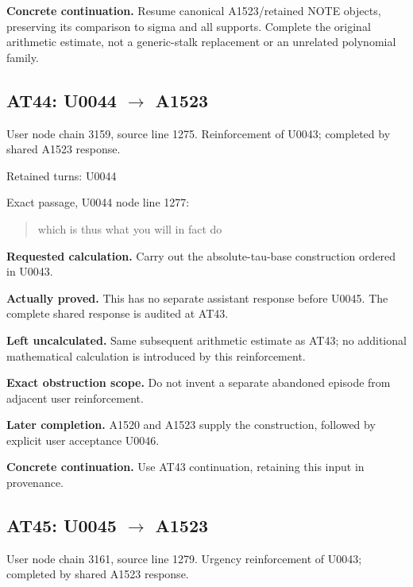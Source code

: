 \documentclass[10pt,a4paper,oneside]{report}
\begin{document}
\textbf{Concrete continuation.} Resume canonical A1523/retained NOTE
objects, preserving its comparison to sigma and all supports. Complete
the original arithmetic estimate, not a generic-stalk replacement or an
unrelated polynomial family.

\subsection{\texorpdfstring{AT44: U0044
\allowbreak{}\ensuremath{→}\allowbreak{}
A1523}{AT44: U0044  A1523}}\label{at44-u0044-a1523}

User node \protect{} chain
3159, source line 1275. Reinforcement of U0043; completed by shared
A1523 response.

Retained turns: U0044
\protect{}

Exact passage, U0044 node
\protect{} line 1277:

\begin{quote}
which is thus what you will in fact do
\end{quote}

\textbf{Requested calculation.} Carry out the absolute-tau-base
construction ordered in U0043.

\textbf{Actually proved.} This has no separate assistant response before
U0045. The complete shared response is audited at AT43.

\textbf{Left uncalculated.} Same subsequent arithmetic estimate as AT43;
no additional mathematical calculation is introduced by this
reinforcement.

\textbf{Exact obstruction scope.} Do not invent a separate abandoned
episode from adjacent user reinforcement.

\textbf{Later completion.} A1520 and A1523 supply the construction,
followed by explicit user acceptance U0046.

\textbf{Concrete continuation.} Use AT43 continuation, retaining this
input in provenance.

\subsection{\texorpdfstring{AT45: U0045
\allowbreak{}\ensuremath{→}\allowbreak{}
A1523}{AT45: U0045  A1523}}\label{at45-u0045-a1523}

User node \protect{} chain
3161, source line 1279. Urgency reinforcement of U0043; completed by
shared A1523 response.
\end{document}
